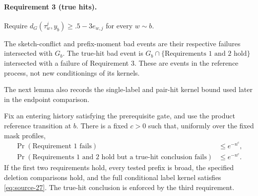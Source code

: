 \paragraph{Requirement 3 (true hits).}
Require \(d_G(\tau_w^j,y_b)\ge .5-3e_{w,j}\) for every \(w\sim b\).

The sketch-conflict and prefix-moment bad events are their respective
failures intersected with \(G_b\). The true-hit bad event is
\(G_b\cap\{\text{Requirements 1 and 2 hold}\}\) intersected with a
failure of Requirement 3. These are events in the reference process,
not new conditionings of its kernels.

The next lemma also records the single-label and pair-hit kernel bound used
later in the endpoint comparison.

\begin{lemma}\label{lem:late-local-transition}
Fix an entering history satisfying the prerequisite gate, and use the product reference transition at \(b\). There is a fixed \(c>0\) such that, uniformly over the fixed mask profiles,
\[
\begin{aligned}
 \Pr(\text{Requirement 1 fails})&\le e^{-n^c},\\
 \Pr(\text{Requirements 1 and 2 hold but a true-hit conclusion fails})
       &\le e^{-n^c}.
\end{aligned}
\]
If the first two requirements hold, every tested prefix is broad, the specified deletion comparisons hold, and the full conditional label kernel satisfies \eqref{eq:source-27}. The true-hit conclusion is enforced by the third requirement.
\end{lemma}

